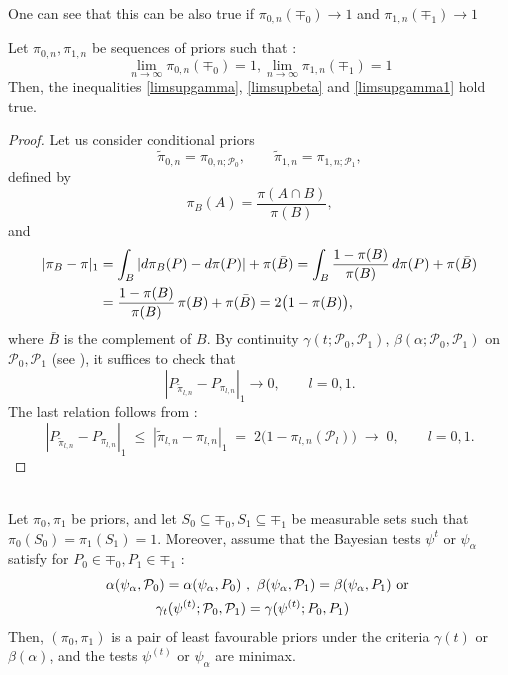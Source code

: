 One can see that this can be also true if $ \pi_{0,n}(\mp_0) \rightarrow 1$ and $ \pi_{1,n}(\mp_1) \rightarrow 1$ 
\begin{prop}\citet[Proposition 2.9]{Ing2012}
    Let $\pi_{0,n},\pi_{1,n}$ be sequences of priors such that : 
    \begin{equation*}
        \lim_{n\rightarrow \infty} \pi_{0,n} (\mp_0) = 1, \lim_{n\rightarrow \infty} \pi_{1,n} (\mp_1) = 1 
    \end{equation*}
    Then, the inequalities \ref{limsupgamma}, \ref{limsupbeta} and \ref{limsupgamma1} hold true. 
\end{prop}
\begin{proof}
Let us consider conditional priors
\[
  \tilde\pi_{0,n} = \pi_{0,n;\mathcal{P}_0}, \qquad
  \tilde\pi_{1,n} = \pi_{1,n;\mathcal{P}_1},
\]
defined by
\[
  \pi_B(A) = \frac{\pi(A \cap B)}{\pi(B)},
\]
and
\begin{align}
  |\pi_B - \pi|_1
    &= \int_B |d\pi_B(P) - d\pi(P)| + \pi(\bar B)
     = \int_B \frac{1 - \pi(B)}{\pi(B)}\,d\pi(P) + \pi(\bar B) \notag\\
    &= \frac{1 - \pi(B)}{\pi(B)}\,\pi(B) + \pi(\bar B)
     = 2\bigl(1 - \pi(B)\bigr),
     \label{eq:2.49}
\end{align}
where $\bar B$ is the complement of $B$. By continuity $\gamma(t; \mathcal{P}_0, \mathcal{P}_1)$,
$\beta(\alpha; \mathcal{P}_0, \mathcal{P}_1)$ on $\mathcal{P}_0, \mathcal{P}_1$
(see \citet[Proposition 2.1]{Ing2012}), it suffices to check that
\[
  |P_{\tilde\pi_{l,n}} - P_{\pi_{l,n}}|_1 \to 0, \qquad l = 0, 1.
\]
The last relation follows from \citet[Eq 2.32]{Ing2012}:
\[
  |P_{\tilde\pi_{l,n}} - P_{\pi_{l,n}}|_1
    \;\leq\; |\tilde\pi_{l,n} - \pi_{l,n}|_1
    \;=\; 2\bigl(1 - \pi_{l,n}(\mathcal{P}_l)\bigr)
    \;\to\; 0, \qquad l = 0, 1.
\]
\end{proof}
\begin{theorem}\citet[Theorem 2.3]{Ing2012}\\
    Let $\pi_0,\pi_1$ be priors, and let $S_0 \subseteq \mp_0, S_1 \subseteq \mp_1$ be measurable sets such that $\pi_0(S_0) = \pi_1(S_1) = 1$. Moreover, assume that the Bayesian tests $\psi^{t}$ or $\psi_{\alpha}$ satisfy for $P_0 \in \mp_0,P_1 \in \mp_1$ : 
    \begin{align}
        \alpha(\psi_\alpha,\mp_0) = \alpha(\psi_\alpha,P_0) \ &, \ \beta(\psi_\alpha,\mp_1) = \beta(\psi_\alpha,P_1) \text{ or } \notag \\
        \gamma_t(\psi^{(t)};\mp_0,\mp_1) &= \gamma(\psi^{(t)};P_0,P_1) \notag
    \end{align}
    Then, $(\pi_0,\pi_1)$ is a pair of least favourable priors under the criteria $\gamma(t)$ or $\beta(\alpha)$, and the tests $\psi^{(t)}$ or $\psi_\alpha$ are minimax. 
\end{theorem}
